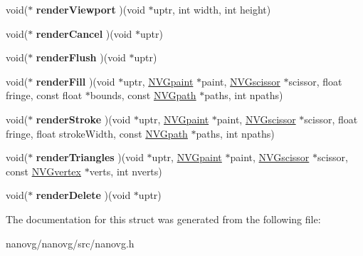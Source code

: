 \begin{DoxyCompactItemize}
\item 
\hypertarget{struct_n_v_gparams_afd36988acfa80d110a09c241f15b0059}{void($\ast$ {\bfseries render\+Viewport} )(void $\ast$uptr, int width, int height)}\label{struct_n_v_gparams_afd36988acfa80d110a09c241f15b0059}

\item 
\hypertarget{struct_n_v_gparams_a0ac3f690b38027133f69f55191567174}{void($\ast$ {\bfseries render\+Cancel} )(void $\ast$uptr)}\label{struct_n_v_gparams_a0ac3f690b38027133f69f55191567174}

\item 
\hypertarget{struct_n_v_gparams_aee5c82793f98015703e7c89bc8739dd5}{void($\ast$ {\bfseries render\+Flush} )(void $\ast$uptr)}\label{struct_n_v_gparams_aee5c82793f98015703e7c89bc8739dd5}

\item 
\hypertarget{struct_n_v_gparams_a3f0709b275cb0290857ff25c1413697d}{void($\ast$ {\bfseries render\+Fill} )(void $\ast$uptr, \hyperlink{struct_n_v_gpaint}{N\+V\+Gpaint} $\ast$paint, \hyperlink{struct_n_v_gscissor}{N\+V\+Gscissor} $\ast$scissor, float fringe, const float $\ast$bounds, const \hyperlink{struct_n_v_gpath}{N\+V\+Gpath} $\ast$paths, int npaths)}\label{struct_n_v_gparams_a3f0709b275cb0290857ff25c1413697d}

\item 
\hypertarget{struct_n_v_gparams_a5dbf82ea943f12666c486fd0588d3273}{void($\ast$ {\bfseries render\+Stroke} )(void $\ast$uptr, \hyperlink{struct_n_v_gpaint}{N\+V\+Gpaint} $\ast$paint, \hyperlink{struct_n_v_gscissor}{N\+V\+Gscissor} $\ast$scissor, float fringe, float stroke\+Width, const \hyperlink{struct_n_v_gpath}{N\+V\+Gpath} $\ast$paths, int npaths)}\label{struct_n_v_gparams_a5dbf82ea943f12666c486fd0588d3273}

\item 
\hypertarget{struct_n_v_gparams_a789ee1bc25628510d42bec82a23463a2}{void($\ast$ {\bfseries render\+Triangles} )(void $\ast$uptr, \hyperlink{struct_n_v_gpaint}{N\+V\+Gpaint} $\ast$paint, \hyperlink{struct_n_v_gscissor}{N\+V\+Gscissor} $\ast$scissor, const \hyperlink{struct_n_v_gvertex}{N\+V\+Gvertex} $\ast$verts, int nverts)}\label{struct_n_v_gparams_a789ee1bc25628510d42bec82a23463a2}

\item 
\hypertarget{struct_n_v_gparams_a92fc1339d100af7cc4b5fdeb7b36e63c}{void($\ast$ {\bfseries render\+Delete} )(void $\ast$uptr)}\label{struct_n_v_gparams_a92fc1339d100af7cc4b5fdeb7b36e63c}

\end{DoxyCompactItemize}


The documentation for this struct was generated from the following file\+:\begin{DoxyCompactItemize}
\item 
nanovg/nanovg/src/nanovg.\+h\end{DoxyCompactItemize}
